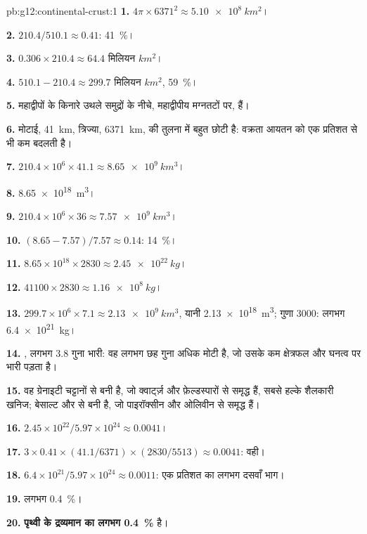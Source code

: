 \begin{solution}{pb:g12:continental-crust:1}
\textbf{1.} $4\pi \times 6371^2 \approx \qty{5.10e8}{km^2}$।

\textbf{2.} $210.4/510.1 \approx 0.41$: \qty{41}{\percent}।

\textbf{3.} $0.306 \times 210.4 \approx \num{64.4}\text{ मिलियन }\unit{km^2}$।

\textbf{4.} $510.1 - 210.4 \approx \num{299.7}\text{ मिलियन }\unit{km^2}$,
\qty{59}{\percent}।

\textbf{5.} महाद्वीपों के किनारे उथले समुद्रों के नीचे,
महाद्वीपीय मग्नतटों पर, हैं।

\textbf{6.} मोटाई, \qty{41}{km}, त्रिज्या, \qty{6371}{km}, की तुलना में
बहुत छोटी है: वक्रता आयतन को एक प्रतिशत से भी
कम बदलती है।

\textbf{7.} $210.4 \times 10^6 \times 41.1 \approx \qty{8.65e9}{km^3}$।

\textbf{8.} \qty{8.65e18}{m^3}।

\textbf{9.} $210.4 \times 10^6 \times 36 \approx \qty{7.57e9}{km^3}$।

\textbf{10.} $(8.65 - 7.57)/7.57 \approx 0.14$: \qty{14}{\percent}।

\textbf{11.} $8.65 \times 10^{18} \times 2830 \approx \qty{2.45e22}{kg}$।

\textbf{12.} $41100 \times 2830 \approx \qty{1.16e8}{kg}$।

\textbf{13.} $299.7 \times 10^6 \times 7.1 \approx \qty{2.13e9}{km^3}$, यानी
\qty{2.13e18}{m^3}; गुणा 3000: लगभग \qty{6.4e21}{kg}।

\textbf{14.} , लगभग 3.8 गुना भारी: वह लगभग छह
गुना अधिक मोटी है, जो उसके कम क्षेत्रफल और घनत्व पर भारी पड़ता है।

\textbf{15.} वह ग्रेनाइटी चट्टानों से बनी है, जो क्वार्ट्ज़ और फ़ेल्डस्पारों से समृद्ध हैं, सबसे
हल्के शैलकारी खनिज;  बेसाल्ट और
 से बनी है, जो पाइरॉक्सीन और ओलिवीन से समृद्ध हैं।

\textbf{16.} $2.45 \times 10^{22}/5.97 \times 10^{24} \approx 0.0041$।

\textbf{17.} $3 \times 0.41 \times (41.1/6371) \times (2830/5513) \approx
0.0041$: वही।

\textbf{18.} $6.4 \times 10^{21}/5.97 \times 10^{24} \approx 0.0011$: एक प्रतिशत का
लगभग दसवाँ भाग।

\textbf{19.} लगभग \qty{0.4}{\percent}।

\textbf{20.}  \textbf{पृथ्वी के द्रव्यमान का लगभग \qty{0.4}{\percent}}
है।
\end{solution}

